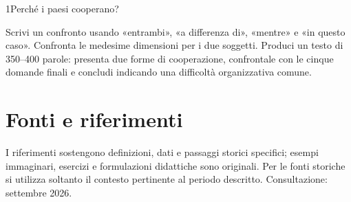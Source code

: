 \begin{lettura}{1}{Perché i paesi cooperano?}



\lingua
Scrivi un confronto usando «entrambi», «a differenza di», «mentre» e «in questo caso». Confronta le medesime dimensioni per i due soggetti.
\scrittura
Produci un testo di 350--400 parole: presenta due forme di cooperazione, confrontale con le cinque domande finali e concludi indicando una difficoltà organizzativa comune.

\end{lettura}
\clearpage\section*{Fonti e riferimenti}
I riferimenti sostengono definizioni, dati e passaggi storici specifici; esempi immaginari, esercizi e formulazioni didattiche sono originali. Per le fonti storiche si utilizza soltanto il contesto pertinente al periodo descritto. Consultazione: settembre 2026.
